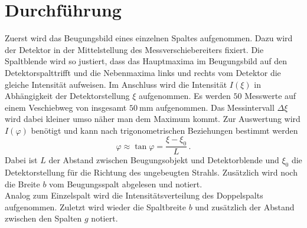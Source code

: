 \section{Durchführung}
\label{sec:Durchführung}
Zuerst wird das Beugungsbild eines einzelnen Spaltes aufgenommen.
Dazu wird der Detektor in der Mittelstellung des Messverschiebereiters fixiert.
Die Spaltblende wird so justiert, dass das Hauptmaxima im Beugungsbild auf den Detektorspalttrifft und die Nebenmaxima links und rechts vom Detektor die gleiche Intensität aufweisen.
Im Anschluss wird die Intensität $I(\xi)$ in Abhängigkeit der Detektorstellung $\xi$ aufgenommen.
Es werden $50$ Messwerte auf einem Veschiebweg von insgesamt $\SI{50}{\milli\metre}$ aufgenommen.
Das Messintervall $\Delta \xi$ wird dabei kleiner umso näher man dem Maximum kommt.
Zur Auswertung wird $I(\varphi)$ benötigt und kann nach trigonometrischen Beziehungen bestimmt werden
\begin{equation}
    \varphi \approx \tan \varphi = \frac{\xi - \xi_0}{L} \, .
\end{equation} 
Dabei ist $L$ der Abstand zwischen Beugungsobjekt und Detektorblende und $\xi_0$ die Detektorstellung für die Richtung des ungebeugten Strahls.
Zusätzlich wird noch die Breite $b$ vom Beugungsspalt abgelesen und notiert.
\\
Analog zum Einzelspalt wird die Intensitätsverteilung des Doppelspalts aufgenommen.
Zuletzt wird wieder die Spaltbreite $b$ und zusätzlich der Abstand zwischen den Spalten $g$ notiert.